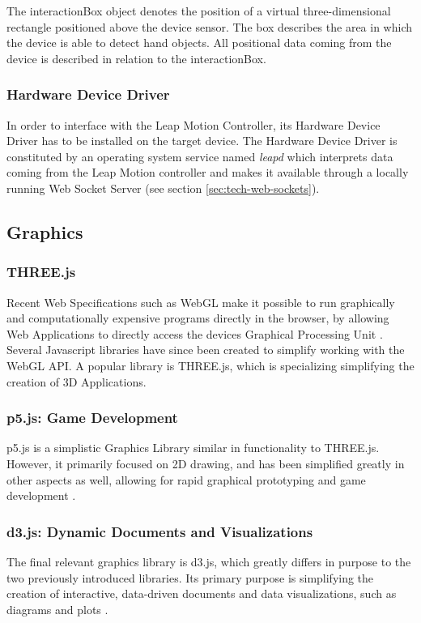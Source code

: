 The interactionBox object denotes the position of a virtual three-dimensional rectangle positioned above the device sensor. The box describes the area in which the device is able to detect hand objects. All positional data coming from the device is described in relation to the interactionBox.

\subsubsection{Hardware Device Driver}
\label{sec:tech:leap-hardware-driver}
In order to interface with the Leap Motion Controller, its Hardware Device Driver has to be installed on the target device. The Hardware Device Driver is constituted by an operating system service named \emph{leapd} which interprets data coming from the Leap Motion controller and makes it available through a locally running Web Socket Server (see section \ref{sec:tech-web-sockets}).
\subsection{Graphics}
\subsubsection{THREE.js}
\label{sec:tech:threejs}
Recent Web Specifications such as WebGL make it possible to run graphically and computationally expensive programs directly in the browser, by allowing Web Applications to directly access the devices Graphical Processing Unit \cite[sec. 1]{WebGl2Spec}. Several Javascript libraries have since been created to simplify working with the WebGL API. A popular library is THREE.js, which is specializing simplifying the creation of 3D Applications.
\subsubsection{p5.js: Game Development}
p5.js is a simplistic Graphics Library similar in functionality to THREE.js. However, it primarily focused on 2D drawing, and has been simplified greatly in other aspects as well, allowing for rapid graphical prototyping and game development \cite{P5JS}.
\subsubsection{d3.js: Dynamic Documents and Visualizations}
The final relevant graphics library is d3.js, which greatly differs in purpose to the two previously introduced libraries. Its primary purpose is simplifying the creation of interactive, data-driven documents and data visualizations, such as diagrams and plots \cite[preface]{zhu2013data}. 
